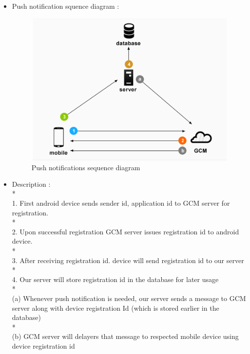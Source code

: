 \begin{itemize}
\begin{itemize}
\item Push notification squence diagram : 
 \begin{figure}[h!]
	\includegraphics[width=13cm]{sequence1.png}
	\caption{Push notifications sequence diagram}
	\end{figure}
\item Description :
\\*  
\\1. First android device sends sender id, application id to GCM server for registration. 
\\*
\\2. Upon successful registration GCM server issues registration id to android device. 
\\*
\\3. After receiving registration id. device will send registration id to our server 
\\*
\\4. Our server will store registration id in the database for later usage 
\\*
\\(a) Whenever push notification is needed, our server sends a message to GCM server along with device registration Id (which is stored earlier in the database)
\\*
\\(b) GCM server will delayers that message to respected mobile device using device registration id 
\end{itemize}
\end{itemize}

